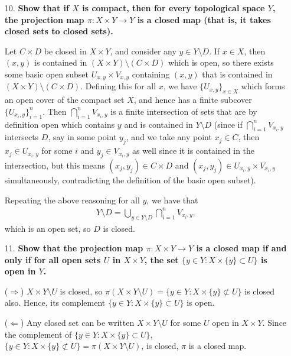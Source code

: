 \documentclass[a4paper,12pt]{article}
\begin{document}
\begin{enumerate}
    \item[10.]
        \boldmath\textbf{Show that if $X$ is compact, then for every topological space $Y$, the projection map $\pi : X \times Y \to Y$ is a closed map (that is, it takes closed sets to closed sets).
        }\unboldmath \par
        Let $C \times D$ be closed in $X \times Y$, and consider any $y \in Y \setminus D$. If $x \in X$, then $(x, y)$ is contained in $(X \times Y) \setminus (C \times D)$ which is open, so there exists some basic open subset $U_{x, y} \times V_{x, y}$ containing $(x, y)$ that is contained in $(X \times Y) \setminus (C \times D)$. Defining this for all $x$, we have $\{ U_{x, y} \}_{x \in X}$ which forms an open cover of the compact set $X$, and hence has a finite subcover $\{ U_{x_i, y} \}_{i = 1}^n$. Then $\bigcap_{i = 1}^n V_{x_i, y}$ is a finite intersection of sets that are by definition open which contains $y$ and is contained in $Y \setminus D$ (since if $\bigcap_{i = 1}^n V_{x_i, y}$ intersects $D$, say in some point $y_j$, and we take any point $x_j \in C$, then $x_j \in U_{x_i, y}$ for some $i$ and $y_j \in V_{x_i, y}$ as well since it is contained in the intersection, but this means $(x_j, y_j) \in C \times D$ and $(x_j, y_j) \in U_{x_i, y} \times V_{x_i, y}$ simultaneously, contradicting the definition of the basic open subset). \par
        Repeating the above reasoning for all $y$, we have that
        \begin{align*}
            Y \setminus D = \bigcup_{y \in Y \setminus D} \bigcap_{i = 1}^n V_{x_i, y},
        \end{align*}
        which is an open set, so $D$ is closed.

    \item[11.]
        \boldmath\textbf{Show that the projection map $\pi : X \times Y \to Y$ is a closed map if and only if for all open sets $U$ in $X \times Y$, the set $\{ y \in Y : X \times \{y\} \subset U \}$ is open in $Y$.
        }\unboldmath \par
        ($\Rightarrow$) $X \times Y \setminus U$ is closed, so $\pi(X \times Y \setminus U) = \{ y \in Y : X \times \{y\} \not\subset U \}$ is closed also. Hence, its complement $\{ y \in Y : X \times \{y\} \subset U \}$ is open. \par
        ($\Leftarrow$) Any closed set can be written $X \times Y \setminus U$ for some $U$ open in $X \times Y$. Since the complement of $\{ y \in Y : X \times \{y\} \subset U \}$, $\{ y \in Y : X \times \{y\} \not\subset U \} = \pi(X \times Y \setminus U)$, is closed, $\pi$ is a closed map.


\end{enumerate}
\end{document}
